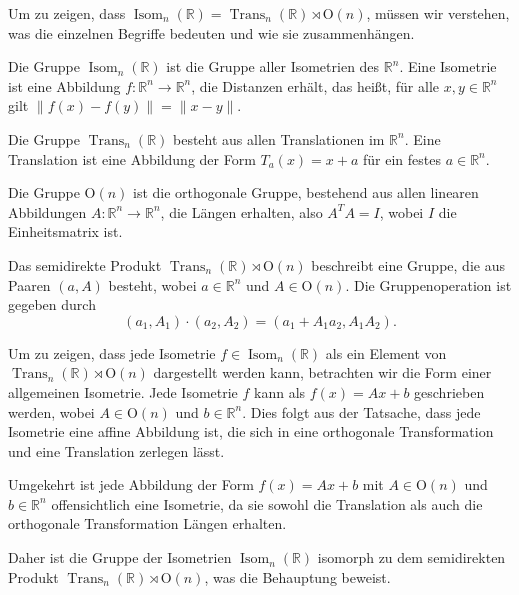 Um zu zeigen, dass $\operatorname{Isom}_n(\mathbb{R}) = \operatorname{Trans}_n(\mathbb{R}) \rtimes \mathrm{O}(n)$, müssen wir verstehen, was die einzelnen Begriffe bedeuten und wie sie zusammenhängen.

Die Gruppe $\operatorname{Isom}_n(\mathbb{R})$ ist die Gruppe aller Isometrien des $\mathbb{R}^n$. Eine Isometrie ist eine Abbildung $f: \mathbb{R}^n \to \mathbb{R}^n$, die Distanzen erhält, das heißt, für alle $x, y \in \mathbb{R}^n$ gilt $\|f(x) - f(y)\| = \|x - y\|$.

Die Gruppe $\operatorname{Trans}_n(\mathbb{R})$ besteht aus allen Translationen im $\mathbb{R}^n$. Eine Translation ist eine Abbildung der Form $T_a(x) = x + a$ für ein festes $a \in \mathbb{R}^n$.

Die Gruppe $\mathrm{O}(n)$ ist die orthogonale Gruppe, bestehend aus allen linearen Abbildungen $A: \mathbb{R}^n \to \mathbb{R}^n$, die Längen erhalten, also $A^T A = I$, wobei $I$ die Einheitsmatrix ist.

Das semidirekte Produkt $\operatorname{Trans}_n(\mathbb{R}) \rtimes \mathrm{O}(n)$ beschreibt eine Gruppe, die aus Paaren $(a, A)$ besteht, wobei $a \in \mathbb{R}^n$ und $A \in \mathrm{O}(n)$. Die Gruppenoperation ist gegeben durch
\[
(a_1, A_1) \cdot (a_2, A_2) = (a_1 + A_1 a_2, A_1 A_2).
\]

Um zu zeigen, dass jede Isometrie $f \in \operatorname{Isom}_n(\mathbb{R})$ als ein Element von $\operatorname{Trans}_n(\mathbb{R}) \rtimes \mathrm{O}(n)$ dargestellt werden kann, betrachten wir die Form einer allgemeinen Isometrie. Jede Isometrie $f$ kann als $f(x) = Ax + b$ geschrieben werden, wobei $A \in \mathrm{O}(n)$ und $b \in \mathbb{R}^n$. Dies folgt aus der Tatsache, dass jede Isometrie eine affine Abbildung ist, die sich in eine orthogonale Transformation und eine Translation zerlegen lässt.

Umgekehrt ist jede Abbildung der Form $f(x) = Ax + b$ mit $A \in \mathrm{O}(n)$ und $b \in \mathbb{R}^n$ offensichtlich eine Isometrie, da sie sowohl die Translation als auch die orthogonale Transformation Längen erhalten.

Daher ist die Gruppe der Isometrien $\operatorname{Isom}_n(\mathbb{R})$ isomorph zu dem semidirekten Produkt $\operatorname{Trans}_n(\mathbb{R}) \rtimes \mathrm{O}(n)$, was die Behauptung beweist.